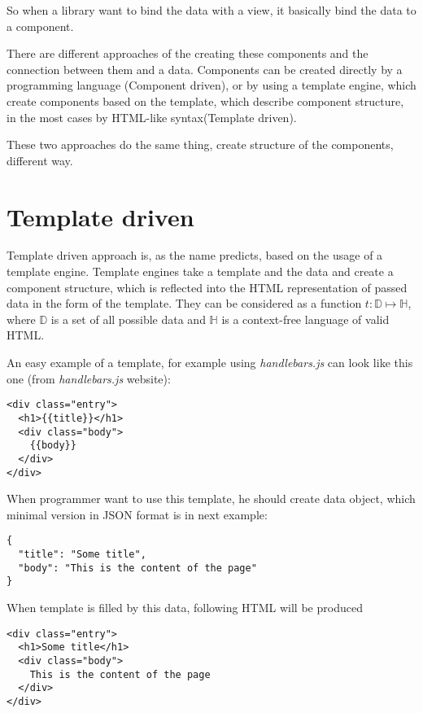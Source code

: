 \documentclass[oneside, 12pt]{book}
\begin{document}
So when a library want to bind the data with a view, it basically bind the data to a component.

There are different approaches of the creating these components and the connection between them and a data. 
Components can be created directly by a programming language (Component driven), 
or by using a template engine, which create components based on the template, 
which describe component structure, in the most cases by HTML-like syntax(Template driven).

These two approaches do the same thing, create structure of the components, different way.

\section{Template driven}\label{sec:existing-template}

	Template driven approach is, as the name predicts, based on the usage of a template engine. 
	Template engines take a template and the data and create a component structure, 
	which is reflected into the HTML representation of passed data in the form of the template. 
	They can be considered as a function $t:\mathbb D\mapsto\mathbb H$, 
	where $\mathbb D$ is a set of all possible data and $\mathbb H$ is a context-free language of valid HTML.

	An easy example of a template, for example using \textit{handlebars.js} can look like this one (from \textit{handlebars.js} website):
\begin{verbatim}
<div class="entry">
  <h1>{{title}}</h1>
  <div class="body">
    {{body}}
  </div>
</div>
\end{verbatim}



	When programmer want to use this template, he should create data object, which minimal version in JSON format is in next example:
\begin{verbatim}
{
  "title": "Some title",
  "body": "This is the content of the page"
}
\end{verbatim}



	When template is filled by this data, following HTML will be produced
\begin{verbatim}
<div class="entry">
  <h1>Some title</h1>
  <div class="body">
    This is the content of the page
  </div>
</div>
\end{verbatim}
\end{document}
